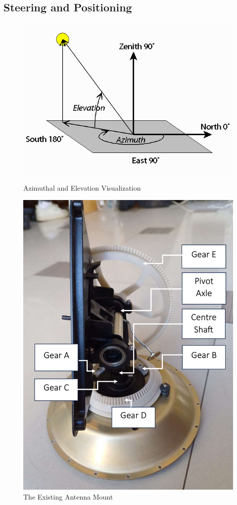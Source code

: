\subsection{Steering and Positioning}\label{sec:gs_steering_positioning}

\begin{figure}[!htb]
  \begin{minipage}{.49\textwidth}
    \centering
    \includegraphics[width=0.9\linewidth]{az_elevation}
    \caption{Azimuthal and Elevation Visualization \cite{site-azElevationVisual}}
    \label{fig:az_elevation}
  \end{minipage}
  \begin{minipage}{.49\textwidth}
    \centering
    \includegraphics[width=0.6\linewidth]{antennaMount}
    \caption{The Existing Antenna Mount}
    \label{fig:antennaMount}
  \end{minipage}
\end{figure}


